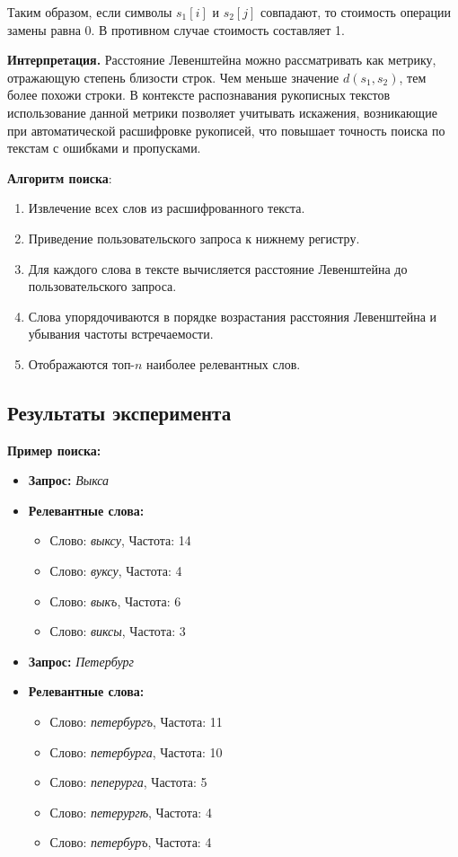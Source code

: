 \documentclass{article}
\begin{document}
Таким образом, если символы $s_1[i]$ и $s_2[j]$ совпадают, то стоимость операции замены равна 0. В противном случае стоимость составляет 1.

\medskip
\textbf{Интерпретация.}  
Расстояние Левенштейна можно рассматривать как метрику, отражающую степень близости строк. Чем меньше значение $d(s_1, s_2)$, тем более похожи строки. В контексте распознавания рукописных текстов использование данной метрики позволяет учитывать искажения, возникающие при автоматической расшифровке рукописей, что повышает точность поиска по текстам с ошибками и пропусками.


\textbf{Алгоритм поиска}:
\begin{enumerate}
\item Извлечение всех слов из расшифрованного текста.
\item Приведение пользовательского запроса к нижнему регистру.
\item Для каждого слова в тексте вычисляется расстояние Левенштейна до пользовательского запроса.
\item Слова упорядочиваются в порядке возрастания расстояния Левенштейна и убывания частоты встречаемости.
\item Отображаются топ-$n$ наиболее релевантных слов.
\end{enumerate}

\subsection{Результаты эксперимента}

\textbf{Пример поиска:}
\begin{itemize}
\item \textbf{Запрос:} \textit{Выкса}
\item \textbf{Релевантные слова:}
\begin{itemize}
\item Слово: \textit{выксу}, Частота: 14
\item Слово: \textit{вуксу}, Частота: 4
\item Слово: \textit{выкъ}, Частота: 6
\item Слово: \textit{виксы}, Частота: 3
\end{itemize}
\item \textbf{Запрос:} \textit{Петербург}
\item \textbf{Релевантные слова:}
\begin{itemize}
\item Слово: \textit{петербургъ}, Частота: 11
\item Слово: \textit{петербурга}, Частота: 10
\item Слово: \textit{пеперурга}, Частота: 5
\item Слово: \textit{петерургѣ}, Частота: 4
\item Слово: \textit{петербуръ}, Частота: 4
\end{itemize}
\end{itemize}
\end{document}
